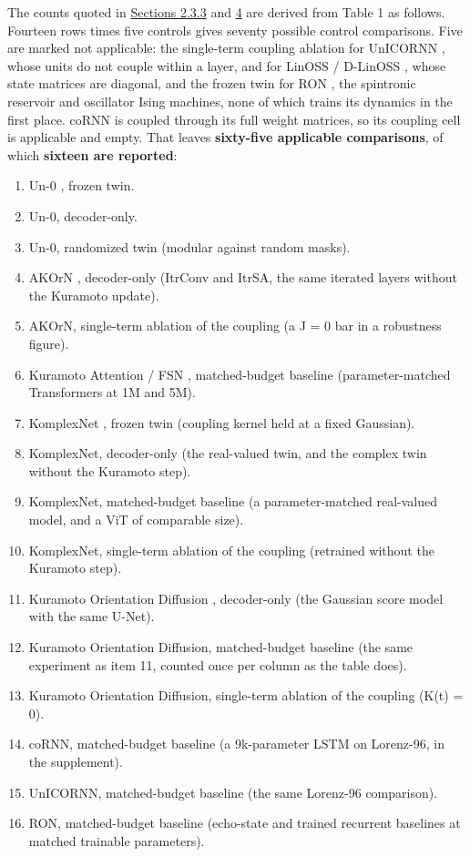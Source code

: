 \documentclass[10pt]{article}
\newcounter{none} %
\providecommand{\tightlist}{%
  \setlength{\itemsep}{0pt}\setlength{\parskip}{0pt}}
\begin{document}
The counts quoted in \hyperref[sec-2-3-3]{Sections 2.3.3} and
\hyperref[sec-4]{4} are derived from Table 1 as follows. Fourteen rows
times five controls gives seventy possible control comparisons. Five are
marked not applicable: the single-term coupling ablation for UnICORNN
\citep{unicornn}, whose units do not couple within a layer, and for
LinOSS \citep{rusch2025} / D-LinOSS \citep{d-linoss}, whose state
matrices are diagonal, and the frozen twin for RON \citep{ceni2024}, the
spintronic reservoir and oscillator Ising machines, none of which trains
its dynamics in the first place. coRNN \citep{rusch2021} is coupled
through its full weight matrices, so its coupling cell is applicable and
empty. That leaves \textbf{sixty-five applicable comparisons}, of which
\textbf{sixteen are reported}:

\begin{enumerate}
\def\labelenumi{\arabic{enumi}.}
\tightlist
\item
  Un-0 \citep{un-0}, frozen twin.
\item
  Un-0, decoder-only.
\item
  Un-0, randomized twin (modular against random masks).
\item
  AKOrN \citep{akorn}, decoder-only (ItrConv and ItrSA, the same
  iterated layers without the Kuramoto update).
\item
  AKOrN, single-term ablation of the coupling (a J = 0 bar in a
  robustness figure).
\item
  Kuramoto Attention \citep{kuramoto-attention} / FSN
  \citep{nunley2026}, matched-budget baseline (parameter-matched
  Transformers at 1M and 5M).
\item
  KomplexNet \citep{muzellec2025}, frozen twin (coupling kernel held at
  a fixed Gaussian).
\item
  KomplexNet, decoder-only (the real-valued twin, and the complex twin
  without the Kuramoto step).
\item
  KomplexNet, matched-budget baseline (a parameter-matched real-valued
  model, and a ViT of comparable size).
\item
  KomplexNet, single-term ablation of the coupling (retrained without
  the Kuramoto step).
\item
  Kuramoto Orientation Diffusion \citep{kuramoto-orientation-diffusion},
  decoder-only (the Gaussian score model with the same U-Net).
\item
  Kuramoto Orientation Diffusion, matched-budget baseline (the same
  experiment as item 11, counted once per column as the table does).
\item
  Kuramoto Orientation Diffusion, single-term ablation of the coupling
  (K(t) = 0).
\item
  coRNN, matched-budget baseline (a 9k-parameter LSTM on Lorenz-96, in
  the supplement).
\item
  UnICORNN, matched-budget baseline (the same Lorenz-96 comparison).
\item
  RON, matched-budget baseline (echo-state and trained recurrent
  baselines at matched trainable parameters).
\end{enumerate}
\end{document}

